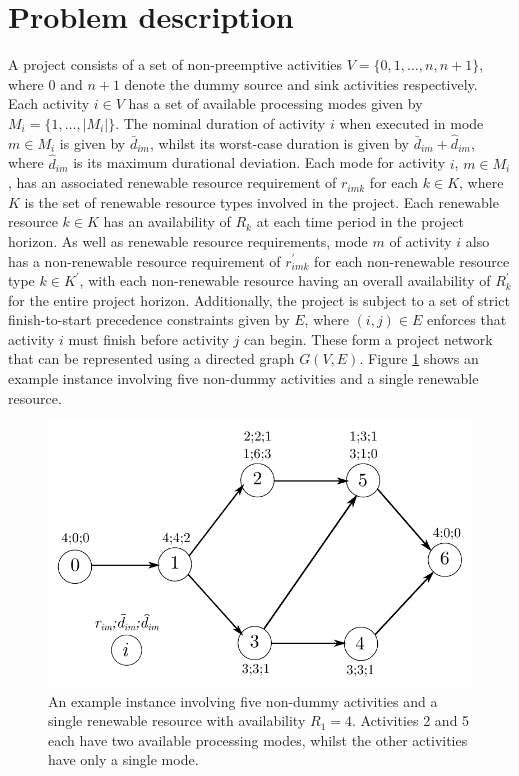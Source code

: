 \documentclass[a4paper,abstracton]{scrartcl}
\begin{document}
\section{Problem description}\label{section:problem_description}

A project consists of a set of non-preemptive activities $V=\{0,1,\dots,n,n+1\}$, where 0 and $n+1$ denote the dummy source and sink activities respectively. Each activity $i\in V$ has a set of available processing modes given by $M_i=\{1,\dots,|M_i|\}$. The nominal duration of activity $i$ when executed in mode $m\in M_i$ is given by $\bar{d}_{im}$, whilst its worst-case duration is given by $\bar{d}_{im}+\hat{d}_{im}$, where $\hat{d}_{im}$ is its maximum durational deviation. Each mode for activity $i$, $m\in M_i$, has an associated renewable resource requirement of $r_{imk}$ for each $k\in K$, where $K$ is the set of renewable resource types involved in the project. Each renewable resource $k\in K$ has an availability of $R_{k}$ at each time period in the project horizon. As well as renewable resource requirements, mode $m$ of activity $i$ also has a non-renewable resource requirement of $r^{'}_{imk}$ for each non-renewable resource type $k\in K^{'}$, with each non-renewable resource having an overall availability of $R^{'}_k$ for the entire project horizon. Additionally, the project is subject to a set of strict finish-to-start precedence constraints given by $E$, where $(i,j)\in E$ enforces that activity $i$ must finish before activity $j$ can begin. These form a project network that can be represented using a directed graph $G(V,E)$. Figure \ref{fig:mrcpsp_network} shows an example instance involving five non-dummy activities and a single renewable resource.

\begin{figure}[h]
	\centering
	\includegraphics[scale=0.9]{mrcpsp_network.pdf}
	\caption{An example instance involving five non-dummy activities and a single renewable resource with availability $R_1=4$. Activities 2 and 5 each have two available processing modes, whilst the other activities have only a single mode.}
	\label{fig:mrcpsp_network}
\end{figure}
\end{document}
